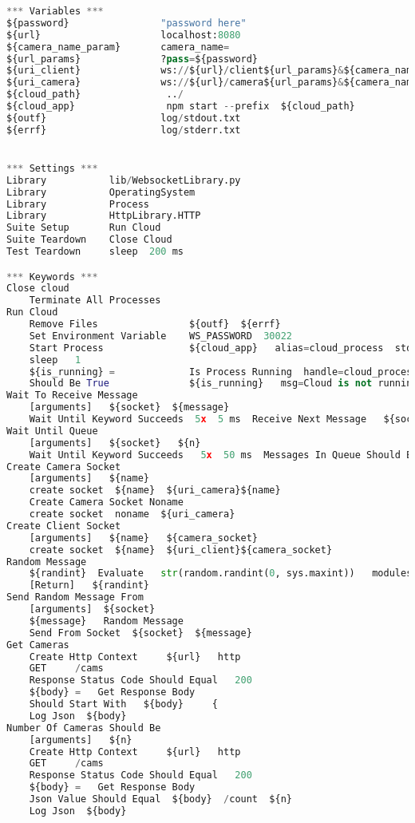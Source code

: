 \documentclass[hidelinks,11pt,a4paper,oneside,article]{memoir}
\begin{document}
\begin{lstlisting}[label={listing:robottest},caption={RobotFramework test file},language=Python, style=styleprogrammingappendix]
*** Variables ***
${password}                "password here"
${url}                     localhost:8080
${camera_name_param}       camera_name=
${url_params}              ?pass=${password}
${uri_client}              ws://${url}/client${url_params}&${camera_name_param}
${uri_camera}              ws://${url}/camera${url_params}&${camera_name_param}
${cloud_path}               ../
${cloud_app}                npm start --prefix  ${cloud_path}
${outf}                    log/stdout.txt
${errf}                    log/stderr.txt


*** Settings ***
Library           lib/WebsocketLibrary.py
Library           OperatingSystem
Library           Process
Library           HttpLibrary.HTTP
Suite Setup       Run Cloud
Suite Teardown    Close Cloud
Test Teardown     sleep  200 ms

*** Keywords ***
Close cloud
    Terminate All Processes
Run Cloud
    Remove Files                ${outf}  ${errf}
    Set Environment Variable    WS_PASSWORD  30022
    Start Process               ${cloud_app}   alias=cloud_process  stdout=${outf}  stderr=${errf}  shell=True
    sleep   1
    ${is_running} =             Is Process Running  handle=cloud_process
    Should Be True              ${is_running}   msg=Cloud is not running
Wait To Receive Message
    [arguments]   ${socket}  ${message}
    Wait Until Keyword Succeeds  5x  5 ms  Receive Next Message   ${socket}  ${message}
Wait Until Queue
    [arguments]   ${socket}   ${n}
    Wait Until Keyword Succeeds   5x  50 ms  Messages In Queue Should Be   ${socket}   ${n}
Create Camera Socket
    [arguments]   ${name}
    create socket  ${name}  ${uri_camera}${name}
    Create Camera Socket Noname
    create socket  noname  ${uri_camera}
Create Client Socket
    [arguments]   ${name}   ${camera_socket}
    create socket  ${name}  ${uri_client}${camera_socket}
Random Message
    ${randint}  Evaluate   str(random.randint(0, sys.maxint))   modules=random, sys
    [Return]   ${randint}
Send Random Message From
    [arguments]  ${socket}
    ${message}   Random Message
    Send From Socket  ${socket}  ${message}
Get Cameras
    Create Http Context 	${url}   http
    GET 	/cams
    Response Status Code Should Equal 	200
    ${body} = 	Get Response Body 	
    Should Start With 	${body} 	{
    Log Json  ${body}
Number Of Cameras Should Be
    [arguments]   ${n}
    Create Http Context 	${url}   http
    GET 	/cams
    Response Status Code Should Equal 	200
    ${body} = 	Get Response Body 	
    Json Value Should Equal  ${body}  /count  ${n}
    Log Json  ${body}
    

\end{lstlisting}
\end{document}
